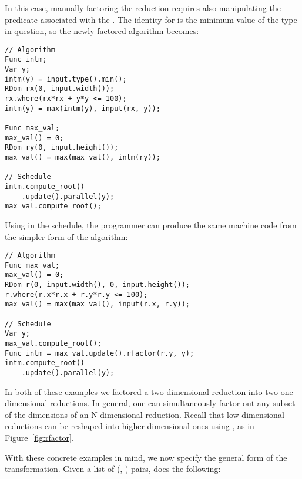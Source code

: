 In this case, manually factoring the reduction requires also manipulating the predicate associated with the . The identity for  is the minimum value of the type in question, so the newly-factored algorithm becomes:

\begin{lstlisting}
// Algorithm
Func intm;
Var y;
intm(y) = input.type().min();
RDom rx(0, input.width());
rx.where(rx*rx + y*y <= 100);
intm(y) = max(intm(y), input(rx, y));

Func max_val;
max_val() = 0;
RDom ry(0, input.height());
max_val() = max(max_val(), intm(ry));

// Schedule
intm.compute_root()
    .update().parallel(y);
max_val.compute_root();
\end{lstlisting}

Using  in the schedule, the programmer can produce the same machine code from the simpler form of the algorithm:

\begin{minipage}{\linewidth}
\begin{lstlisting}
// Algorithm
Func max_val;
max_val() = 0;
RDom r(0, input.width(), 0, input.height());
r.where(r.x*r.x + r.y*r.y <= 100);
max_val() = max(max_val(), input(r.x, r.y));

// Schedule
Var y;
max_val.compute_root();
Func intm = max_val.update().rfactor(r.y, y);
intm.compute_root()
    .update().parallel(y);
\end{lstlisting}
\end{minipage}

In both of these examples we factored a two-dimensional reduction into two one-dimensional reductions. In general, one can simultaneously factor out any subset of the dimensions of an N-dimensional reduction. Recall that low-dimensional reductions can be reshaped into higher-dimensional ones using , as in Figure~\ref{fig:rfactor}.

With these concrete examples in mind, we now specify the general form of the transformation. Given a list of (, ) pairs,  does the following:

